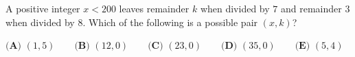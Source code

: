 A positive integer \(x<200\) leaves remainder \(k\) when divided by \(7\) and remainder \(3\) when divided by \(8\). Which of the following is a possible pair \((x,k)\)?

\(\textbf{(A) } (1,5) \qquad\textbf{(B) } (12,0) \qquad\textbf{(C) } (23,0) \qquad\textbf{(D) } (35,0) \qquad\textbf{(E) } (5,4)\)
